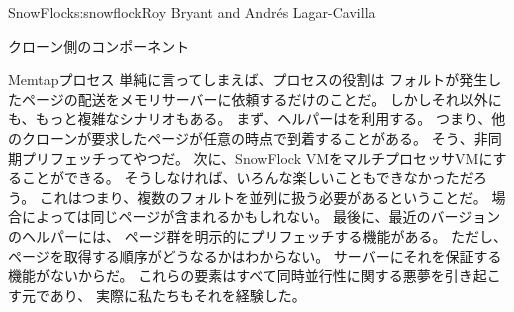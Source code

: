 \begin{aosachapter}{SnowFlock}{s:snowflock}{Roy Bryant and Andr\'e{s} Lagar-Cavilla}
\begin{aosasect1}{クローン側のコンポーネント}
\begin{aosasect2}{Memtapプロセス}
単純に言ってしまえば、プロセスの役割は
フォルトが発生したページの配送をメモリサーバーに依頼するだけのことだ。
しかしそれ以外にも、もっと複雑なシナリオもある。
まず、ヘルパーはを利用する。
つまり、他のクローンが要求したページが任意の時点で到着することがある。
そう、非同期プリフェッチってやつだ。
次に、SnowFlock VMをマルチプロセッサVMにすることができる。
そうしなければ、いろんな楽しいこともできなかっただろう。
これはつまり、複数のフォルトを並列に扱う必要があるということだ。
場合によっては同じページが含まれるかもしれない。
最後に、最近のバージョンのヘルパーには、
ページ群を明示的にプリフェッチする機能がある。
ただし、ページを取得する順序がどうなるかはわからない。
サーバーにそれを保証する機能がないからだ。
これらの要素はすべて同時並行性に関する悪夢を引き起こす元であり、
実際に私たちもそれを経験した。


\end{aosasect2}
\end{aosasect1}
\end{aosachapter}
